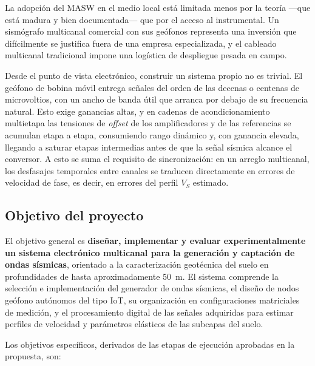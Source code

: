 La adopci\'on del MASW en el medio local est\'a limitada menos por la teor\'ia ---que est\'a
madura y bien documentada--- que por el acceso al instrumental. Un sismógrafo
multicanal comercial con sus ge\'ofonos representa una inversi\'on que dif\'icilmente se
justifica fuera de una empresa especializada, y el cableado multicanal tradicional
impone una log\'istica de despliegue pesada en campo.

Desde el punto de vista electr\'onico, construir un sistema propio no es trivial. El
ge\'ofono de bobina m\'ovil entrega se\~nales del orden de las decenas o centenas de
microvoltios, con un ancho de banda \'util que arranca por debajo de su frecuencia
natural. Esto exige ganancias altas, y en cadenas de acondicionamiento multietapa las
tensiones de \emph{offset} de los amplificadores y de las referencias se acumulan
etapa a etapa, consumiendo rango din\'amico y, con ganancia elevada, llegando a saturar
etapas intermedias antes de que la se\~nal s\'ismica alcance el conversor. A esto se suma
el requisito de sincronizaci\'on: en un arreglo multicanal, los desfasajes temporales
entre canales se traducen directamente en errores de velocidad de fase, es decir, en
errores del perfil $V_S$ estimado.

\subsection{Objetivo del proyecto}

El objetivo general es \textbf{dise\~nar, implementar y evaluar experimentalmente un
sistema electr\'onico multicanal para la generaci\'on y captaci\'on de ondas s\'ismicas},
orientado a la caracterizaci\'on geot\'ecnica del suelo en profundidades de hasta
aproximadamente \SI{50}{\meter}. El sistema comprende la selecci\'on e implementaci\'on
del generador de ondas s\'ismicas, el dise\~no de nodos ge\'ofono aut\'onomos del tipo IoT,
su organizaci\'on en configuraciones matriciales de medici\'on, y el procesamiento digital
de las se\~nales adquiridas para estimar perfiles de velocidad y par\'ametros el\'asticos
de las subcapas del suelo.

Los objetivos espec\'ificos, derivados de las etapas de ejecuci\'on aprobadas en la
propuesta, son:

